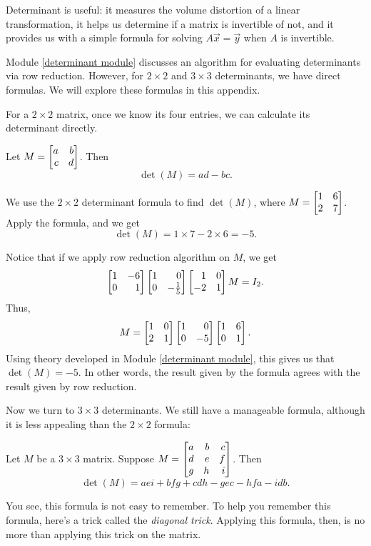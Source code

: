 Determinant is useful: it measures the volume distortion of a linear transformation,
it helps us determine if a matrix is invertible of not, and it provides us with a
simple formula for solving $A\vec x=\vec y$ when $A$ is invertible.

Module \ref{determinant module} discusses an algorithm for evaluating determinants
via row reduction. However, for $2\times 2$ and $3\times 3$ determinants, we
have direct formulas. We will explore these formulas in this appendix.

 For a $2\times 2$ matrix, once we
know its four entries, we can calculate its determinant directly.
\begin{theorem}
	Let $M=\mat{a & b \\ c & d}$. Then
	\[
		\det(M)=ad-bc.
	\]
\end{theorem}
\begin{example}
	We use the $2\times 2$ determinant formula to find $\det(M)$, where
	$M=\mat{1 & 6 \\ 2 & 7}$. Apply the formula, and we get
	\[
		\det(M)=1\times 7-2\times 6=-5.
	\]
\end{example}
Notice that if we apply row reduction algorithm on $M$, we get
\[
	\mat{1 & -6 \\ 0 & 1}\mat{1 & 0 \\ 0 & -\frac{1}{5}}\mat{1 & 0 \\ -2 & 1}M=I_{2}.
\]
Thus,
\[
	M=\mat{1 & 0 \\ 2 & 1}\mat{1 & 0 \\ 0 & -5}\mat{1 & 6 \\ 0 & 1}.
\]
Using theory developed in Module \ref{determinant module}, this gives us that
$\det(M)=-5$. In other words, the result given by the formula agrees with the
result given by row reduction.

 Now we turn
to $3\times 3$ determinants. We still have a manageable formula, although it is less
appealing than the $2\times 2$ formula:
\begin{theorem}
	Let $M$ be a $3\times 3$ matrix. Suppose
	$M=\mat{a & b & c \\ d & e & f \\ g & h & i}$. Then
	\[
		\det(M)=aei+bfg+cdh-gec-hfa-idb.
	\]
\end{theorem}
You see, this formula is not easy to remember. To help you remember this formula,
here's a trick called the \textit{diagonal trick}. Applying this formula, then, is
no more than applying this trick on the matrix.

